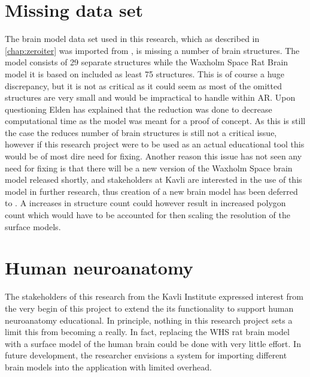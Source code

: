 \section{Missing data set}
The brain model data set used in this research, which as described in \autoref{chap:zeroiter} was imported from , is missing a number of brain structures. The model consists of 29 separate structures while the Waxholm Space Rat Brain model it is based on included as least 75 structures. This is of course a huge discrepancy, but it is not as critical as it could seem as most of the omitted structures are very small and would be impractical to handle within AR. Upon questioning Elden has explained that the reduction was done to decrease computational time as the model was meant for a proof of concept. As this is still the case the reduces number of brain structures is still not a critical issue, however if this research project were to be used as an actual educational tool this would be of most dire need for fixing. Another reason this issue has not seen any need for fixing is that there will be a new version of the Waxholm Space brain model released shortly, and stakeholders at Kavli are interested in the use of this model in further research, thus creation of a new brain model has been deferred to . A increases in structure count could however result in increased polygon count which would have to be accounted for then scaling the resolution of the surface models.

\section{Human neuroanatomy}

The stakeholders of this research from the Kavli Institute expressed interest from the very begin of this project to extend the its functionality to support human neuroanatomy educational. In principle, nothing in this research project sets a limit this from becoming a really. In fact, replacing the WHS rat brain model with a surface model of the human brain could be done with very little effort. In future development, the researcher envisions a system for importing different brain models into the application with limited overhead. 




